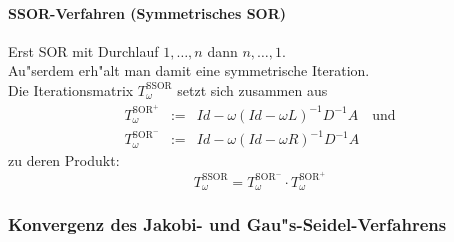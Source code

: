 \documentclass{scrartcl}
\begin{document}
\paragraph{SSOR-Verfahren (Symmetrisches SOR)}
Erst SOR mit Durchlauf $1, \ldots, n$ dann $n, \ldots, 1$. \\
Au"serdem erh"alt man damit eine symmetrische Iteration. \\
Die Iterationsmatrix $T_\omega^{\mathrm{SSOR}}$ setzt sich zusammen aus
\begin{eqnarray*}
T_\omega^{\mathrm{SOR}^+} & := & Id - \omega(Id - \omega L)^{-1} D^{-1} A \quad \mathrm{und} \\
T_\omega^{\mathrm{SOR}^-} & := & Id - \omega(Id - \omega R)^{-1} D^{-1} A
\end{eqnarray*}
zu deren Produkt:
$$T_\omega^\mathrm{SSOR} = T_\omega^{\mathrm{SOR}^-} \cdot T_\omega^{\mathrm{SOR}^+}$$
\subsubsection{Konvergenz des Jakobi- und Gau"s-Seidel-Verfahrens}
\end{document}
